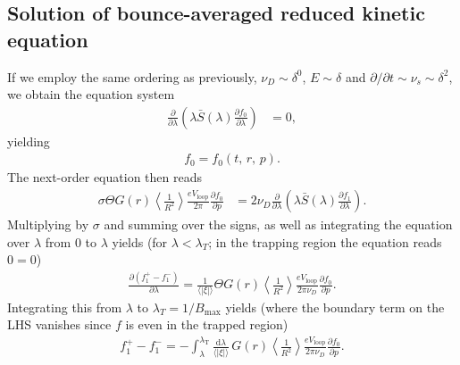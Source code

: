 \documentclass[11pt,a4paper]{article}
\newcommand{\rd}{\ensuremath{\mathrm{d}}}
\newcommand{\sub}[1]{\ensuremath{_{\text{#1}}}}
\begin{document}
\subsection{Solution of bounce-averaged reduced kinetic equation}
If we employ the same ordering as previously, $\nu_D \sim \delta^0$, $E\sim \delta$ and $\partial/\partial t \sim \nu_s \sim \delta^2$, we obtain the equation system
\begin{align}
\frac{\partial}{\partial \lambda} \left(\lambda \bar{S}(\lambda)\frac{\partial f_0}{\partial \lambda}\right) &= 0,
\end{align}
yielding
\begin{align}
f_0 = f_0(t,\,r,\,p).
\end{align}
The next-order equation then reads
\begin{align}
\sigma  \Theta G(r) \left\langle\frac{1}{R^2}\right\rangle\frac{eV\sub{loop}}{2\pi}\frac{\partial  f_0}{\partial p} &= 2\nu_D \frac{\partial}{\partial \lambda} \left(\lambda \bar{S}(\lambda)\frac{\partial f_1}{\partial \lambda}\right) .
\end{align}
Multiplying by $\sigma$ and summing over the signs, as well as integrating the equation over $\lambda$ from 0 to $\lambda$ yields (for $\lambda < \lambda_T$; in the trapping region the equation reads $0=0$)
\begin{align}
 \frac{\partial (f_1^+-f_1^-)}{\partial \lambda} = \frac{1}{\langle |\xi|\rangle}\Theta G(r) \left\langle\frac{1}{R^2}\right\rangle\frac{eV\sub{loop}}{2\pi\nu_D}\frac{\partial  f_0}{\partial p}.
\end{align}
Integrating this from $\lambda$ to $\lambda_T=1/B\sub{max}$ yields (where the boundary term on the LHS vanishes since $f$ is even in the trapped region)
\begin{align}
f_1^+-f_1^- = -\int_\lambda^{\lambda\sub{T}} \frac{\rd \lambda }{\langle |\xi|\rangle} \, G(r)\left\langle\frac{1}{R^2}\right\rangle\frac{eV\sub{loop}}{2\pi\nu_D}\frac{\partial  f_0}{\partial p}.
\end{align}
\end{document}
